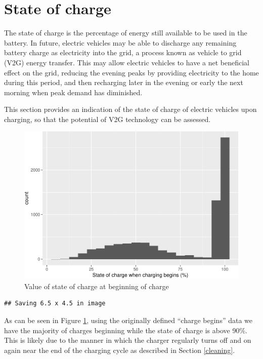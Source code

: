 \documentclass[]{article}
\begin{document}
\section{State of charge}\label{SoC}

The state of charge is the percentage of energy still available to be
used in the battery. In future, electric vehicles may be able to
discharge any remaining battery charge as electricity into the grid, a
process known as vehicle to grid (V2G) energy transfer. This may allow
electric vehicles to have a net beneficial effect on the grid, reducing
the evening peaks by providing electricity to the home during this
period, and then recharging later in the evening or early the next
morning when peak demand has diminished.

This section provides an indication of the state of charge of electric
vehicles upon charging, so that the potential of V2G technology can be
assessed.

\begin{figure}
\centering
\includegraphics{EVBB_report_files/figure-latex/SoCplot1-1.pdf}
\caption{\label{fig:SoCplot1}Value of state of charge at beginning of
charge}
\end{figure}

\begin{verbatim}
## Saving 6.5 x 4.5 in image
\end{verbatim}

As can be seen in Figure \ref{fig:SoCplot1}, using the originally
defined ``charge begins'' data we have the majority of charges beginning
while the state of charge is above 90\%. This is likely due to the
manner in which the charger regularly turns off and on again near the
end of the charging cycle as described in Section \ref{cleaning}.
\end{document}
